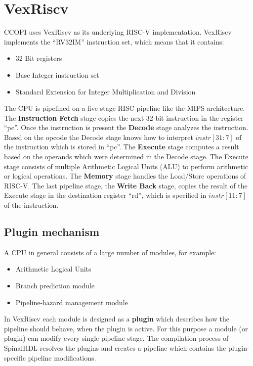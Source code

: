 \documentclass[twoside,twocolumn]{article}
\begin{document}
\section{VexRiscv}
CCOPI uses VexRiscv as its underlying RISC-V implementation. VexRiscv 
implements the ``RV32IM'' instruction set, which means that it contains:
\begin{itemize}
    \item 32 Bit registers
    \item Base Integer instruction set
    \item Standard Extension for Integer
Multiplication and Division
\end{itemize}
The CPU is pipelined on a five-stage RISC pipeline like the MIPS
architecture. The \textbf{Instruction Fetch} stage
copies the next 32-bit instruction in the register ``pc''. Once the
instruction is present the \textbf{Decode} stage analyzes the instruction. 
Based on the opcode
the Decode stage knows how to interpret $instr[31:7]$ of the instruction
which is stored in ``pc''. The \textbf{Execute} stage computes a result
based on the operands which were determined in the Decode stage. The
Execute stage consists of multiple Arithmetic Logical Units (ALU) to
perform arithmetic or logical operations. The \textbf{Memory} stage
handles the Load/Store operations of RISC-V. The last pipeline stage,
the \textbf{Write Back} stage, copies the result of the Execute stage in
the destination register ``rd'', which is specified in $instr[11:7]$ of
the instruction.
\subsection{Plugin mechanism}
A CPU in general consists of a large number of modules, for example:
\begin{itemize}
    \item Arithmetic Logical Units
    \item Branch prediction module
    \item Pipeline-hazard management module
\end{itemize}
In VexRiscv each module is designed as a \textbf{plugin} which describes how the
pipeline should behave, when the plugin is active. For this purpose
a module (or plugin) can modify every single pipeline stage. The
compilation process of SpinalHDL resolves the plugins and creates a
pipeline which contains the plugin-specific pipeline
modifications.
\end{document}
